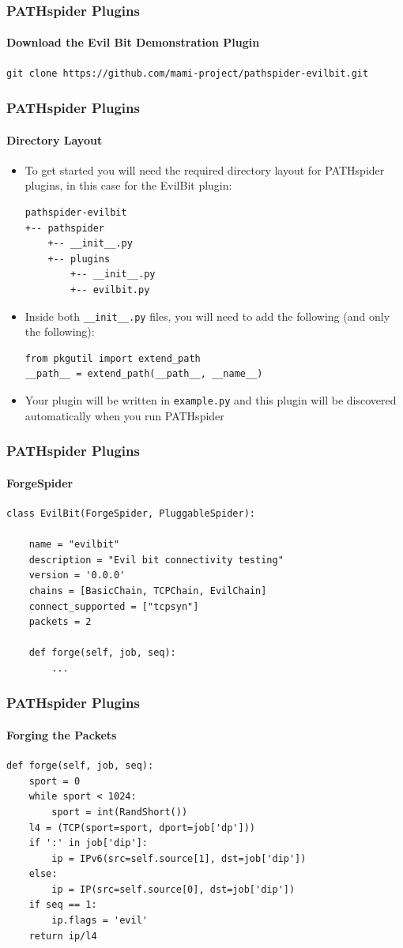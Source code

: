 \documentclass{beamer}
\begin{document}
\begin{frame}[fragile]
\frametitle{PATHspider Plugins}
\framesubtitle{Download the Evil Bit Demonstration Plugin}
\begin{lstlisting}[caption={Download the Evil Bit Demonstration Plugin}]
git clone https://github.com/mami-project/pathspider-evilbit.git
\end{lstlisting}
\end{frame}

\begin{frame}[fragile]
\frametitle{PATHspider Plugins}
\framesubtitle{Directory Layout}
\begin{itemize}
\item{To get started you will need the required directory layout for PATHspider
plugins, in this case for the EvilBit plugin:}
{\footnotesize\begin{verbatim}
pathspider-evilbit
+-- pathspider
    +-- __init__.py
    +-- plugins
        +-- __init__.py
        +-- evilbit.py
\end{verbatim}}
\item{Inside both \texttt{\_\_init\_\_.py} files, you will need to add the
following (and only the following):
\begin{lstlisting}
from pkgutil import extend_path
__path__ = extend_path(__path__, __name__)
\end{lstlisting}}
\item{Your plugin will be written in \texttt{example.py} and this plugin will be
discovered automatically when you run PATHspider}
\end{itemize}
\end{frame}

\begin{frame}[fragile]
\frametitle{PATHspider Plugins}
\framesubtitle{ForgeSpider}
\begin{lstlisting}[caption={Outline for Evil Bit plugin using ForgeSpider}]
class EvilBit(ForgeSpider, PluggableSpider):

    name = "evilbit"
    description = "Evil bit connectivity testing"
    version = '0.0.0'
    chains = [BasicChain, TCPChain, EvilChain]
    connect_supported = ["tcpsyn"]
    packets = 2

    def forge(self, job, seq):
        ...
\end{lstlisting}
\end{frame}

\begin{frame}[fragile]
\frametitle{PATHspider Plugins}
\framesubtitle{Forging the Packets}
\begin{lstlisting}[caption={Creating Packets With and Without the Evil Bit}]
def forge(self, job, seq):
    sport = 0
    while sport < 1024:
        sport = int(RandShort())
    l4 = (TCP(sport=sport, dport=job['dp']))
    if ':' in job['dip']:
        ip = IPv6(src=self.source[1], dst=job['dip'])
    else:
        ip = IP(src=self.source[0], dst=job['dip'])
    if seq == 1:
        ip.flags = 'evil'
    return ip/l4
\end{lstlisting}
\end{frame}
\end{document}
